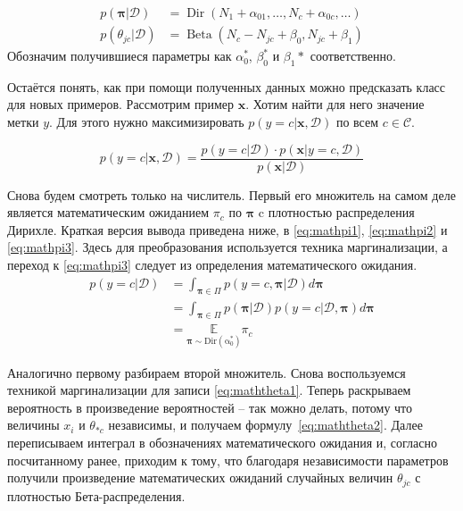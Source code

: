 \begin{align}
  p(\mathbf{\pi}|\mathcal{D}) &= \operatorname{Dir}(N_1+\alpha_{01},\ldots,N_c+\alpha_{0c},\ldots)\label{eq:pi}\\
  p(\theta_{jc}|\mathcal{D}) &= \operatorname{Beta}(N_c-N_{jc} + \beta_0, N_{jc}+\beta_1) \label{eq:thetajc}
\end{align}
Обозначим получившиеся параметры как $\alpha_0^*$, $\beta_0^*$ и $\beta_1*$ соответственно.

Остаётся понять, как при помощи полученных данных можно предсказать класс для новых
примеров. Рассмотрим пример $\mathbf{x}$. Хотим найти для него значение метки $y$. Для этого нужно
максимизировать $p(y=c|\mathbf{x},\mathcal{D})$ по всем $c\in\mathcal{C}$.

\begin{equation}
  p(y=c|\mathbf{x},\mathcal{D}) =
  \frac{p(y=c|\mathcal{D})\cdot p(\mathbf{x}|y=c,\mathcal{D})}{p(\mathbf{x}|\mathcal{D})}
  \label{eq:bnbpred}
\end{equation}

Снова будем смотреть только на числитель. Первый его множитель на самом деле является математическим
ожиданием $\pi_c$ по $\mathbf{\pi}$ c плотностью распределения Дирихле. Краткая версия вывода
приведена ниже, в \ref{eq:mathpi1}, \ref{eq:mathpi2} и \ref{eq:mathpi3}. Здесь для
преобразования \label{eq:mathpi1} используется техника маргинализации, а переход к \ref{eq:mathpi3}
следует из определения математического ожидания.
\begin{align}
  p(y=c|\mathcal{D})&=\int_{\mathbf{\pi}\in\Pi}p(y=c,\mathbf{\pi}|\mathcal{D})d\mathbf{\pi}\label{eq:mathpi1}\\
  &= \int_{\mathbf{\pi}\in\Pi}p(\mathbf{\pi}|\mathcal{D})p(y=c|\mathcal{D},\mathbf{\pi})d\mathbf{\pi}\label{eq:mathpi2}\\
  &= \underset{\mathbf{\pi}\sim\operatorname{Dir(\alpha_0^*)}}{\mathbb{E}}\pi_c
  \label{eq:mathpi3}
\end{align}

Аналогично первому разбираем второй множитель. Снова воспользуемся техникой маргинализации
для записи \ref{eq:maththeta1}. Теперь раскрываем вероятность  в произведение вероятностей
-- так можно делать, потому что величины $x_i$ и $\theta_{*c}$ независимы, и получаем
 формулу~\ref{eq:maththeta2}. Далее переписываем интеграл в обозначениях математического ожидания и, согласно
посчитанному ранее, приходим к тому, что благодаря независимости параметров получили произведение
математических ожиданий случайных величин $\theta_{jc}$ с плотностью Бета-распределения.

